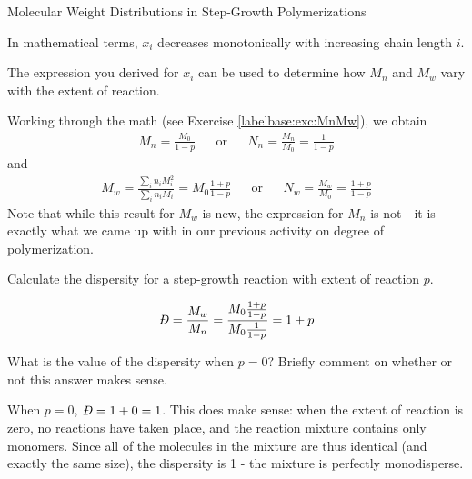 \begin{activity}{Molecular Weight Distributions in Step-Growth Polymerizations}
\begin{ctqs}
\begin{solution}[1.5in]
			In mathematical terms, $x_i$ decreases monotonically with increasing chain length $i$.
		
		\end{solution}
	
\end{ctqs}

\clearpage
\begin{model}
\label{\labelbase:mdl:MwMn}

	The expression you derived for $x_i$ can be used to determine how $M_n$ and $M_w$ vary with the extent of reaction.
	
	Working through the math (see Exercise \ref{labelbase:exc:MnMw}), we obtain
	\begin{align*}
		M_n = \frac{M_0}{1-p} && \text{or} && N_n = \frac{M_n}{M_0} = \frac{1}{1-p}
	\end{align*}
	and
	\begin{align*}
		M_w = \frac{\sum_i n_i M_i^2}{\sum_i n_i M_i} = M_0\frac{1+p}{1-p} && \text{or} && N_w = \frac{M_w}{M_0} = \frac{1+p}{1-p}
	\end{align*}
	Note that while this result for $M_w$ is new, the expression for $M_n$ is not - it is exactly what we came up with in our previous activity on degree of polymerization.

\end{model}

\begin{ctqs}
		\question Calculate the dispersity for a step-growth reaction with extent of reaction $p$.
		
			\begin{solution}[1.25in]
			
				\begin{equation*}
					\PDImath = \frac{M_w}{M_n} = \frac{M_0\frac{1+p}{1-p}}{M_0\frac{1}{1-p}} = 1+p
				\end{equation*}
			\end{solution}
			
			
		\question What is the value of the dispersity when $p=0$?  Briefly comment on whether or not this answer makes sense.
		
			\begin{solution}[1.5in]
			
				When $p=0$, $\PDImath=1+0 = 1$.  This does make sense: when the extent of reaction is zero, no reactions have taken place, and the reaction mixture contains only monomers.  Since all of the molecules in the mixture are thus identical (and exactly the same size), the dispersity is 1 - the mixture is perfectly monodisperse.
			

\end{solution}
\end{ctqs}
\end{activity}
